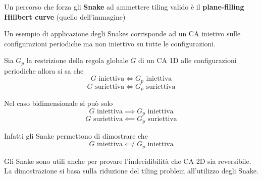 \begin{nota}
    Un percorso che forza gli \textbf{Snake} ad ammettere tiling valido è il \textbf{
        plane-filling Hillbert curve} (quello dell'immagine)
\end{nota}

\begin{esempio}
    Un esempio di applicazione degli Snakes corrisponde ad un CA inietivo sulle configurazioni periodiche
    ma non iniettivo su tutte le configurazioni.
\end{esempio}

Sia $G_p$ la restrizione della regola globale $G$ di un CA 1D alle configurazioni
periodiche allora
si sa che
$$G \text{ iniettiva} \iff G_p \text{ iniettiva}$$
$$G \text{ suriettiva} \iff G_p \text{ suriettiva}$$

Nel caso bidimensionale si può solo
$$G \text{ iniettiva} \implies G_p \text{ iniettiva}$$
$$G \text{ suriettiva} \impliedby G_p \text{ suriettiva}$$

Infatti gli Snake permettono di dimostrare che
$$G \text{ iniettiva} \not\impliedby G_p \text{ iniettiva}$$

Gli Snake sono utili anche per provare l'indecidibilità che CA 2D sia reversibile.
La dimostrazione si basa sulla riduzione del tiling problem all'utilizzo degli
Snake.

